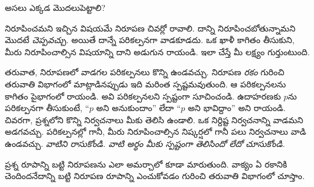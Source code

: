 \documentclass[../../../include/open-logic-section]{subfiles}
\begin{document}


అసలు ఎక్కడ మొదలుపెట్టాలి?

నిరూపించమని ఇచ్చిన విషయమే నిరూపణ చివర్లో రావాలి. దాన్ని
నిరూపించబోతున్నామని మొదటే \emph{చెప్పవచ్చు}. అయితే దాన్నే
పరికల్పనగా వాడకూడదు. ఒక ఖాళీ కాగితం తీసుకుని, మీరు
నిరూపించాల్సిన విషయాన్ని దాని అడుగున రాయండి. ఇలా చేస్తే
మీ లక్ష్యం గుర్తుంటుంది.

తరువాత, నిరూపణలో వాడగల పరికల్పనలు కొన్ని ఉండవచ్చు.
నిరూపణ \emph{రకం} గురించి తరువాతి విభాగంలో మాట్లాడినప్పుడు
ఇది మరింత స్పష్టమవుతుంది. ఆ పరికల్పనలను కాగితం పైభాగంలో రాయండి.
అవి పరికల్పనలని స్పష్టంగా సూచించండి. ఉదాహరణకు $p$ను
పరికల్పనగా తీసుకుంటే, ``$p$ అని అనుకుందాం'' లేదా
``$p$ అని భావిద్దాం'' అని రాయండి. చివరగా, ప్రశ్నలోని కొన్ని
నిర్వచనాలు మీకు తెలిసి ఉండాలి. ఒక నిర్దిష్ట నిర్వచనాన్ని వాడమని
అడగవచ్చు. పరికల్పనల్లో గానీ, మీరు నిరూపించాల్సిన నిష్కర్షలో
గానీ పలు నిర్వచనాలు వాడి ఉండవచ్చు. \emph{వాటిని రాసుకోండి.
వాటి అర్థం మీకు స్పష్టంగా తెలిసిందో లేదో చూసుకోండి.}

ప్రశ్న రూపాన్ని బట్టి నిరూపణను ఎలా అమర్చాలో కూడా మారుతుంది. వాక్యం ఏ రకానికి చెందిందనేదాన్ని బట్టి నిరూపణ రూపాన్ని ఎంచుకోవడం గురించి తరువాతి విభాగంలో చూస్తాం.
\end{document}
